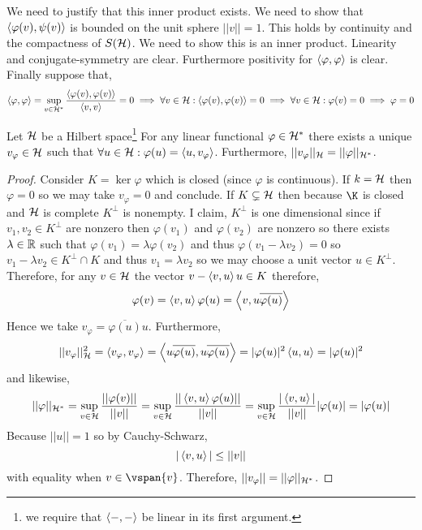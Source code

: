 \documentclass[12pt]{article}
\begin{document}
\begin{rmk}
We need to justify that this inner product exists. We need to show that $\left< \varphi(v) , \psi(v) \right>$ is bounded on the unit sphere $||v|| = 1$. This holds by continuity and the compactness of $S(\mathcal{H})$.
We need to show this is an inner product. Linearity and conjugate-symmetry are clear. Furthermore positivity for $\left< \varphi , \varphi \right>$ is clear. Finally suppose that,
\[ \left< \varphi , \varphi \right> = \sup_{v \in \mathcal{H}^*} \frac{\left< \varphi(v) , \varphi(v) \right>}{\left< v , v \right>} = 0 \implies \forall v \in \mathcal{H} : \left< \varphi(v) , \varphi(v) \right> = 0 \implies \forall v \in \mathcal{H} : \varphi(v) = 0 \implies \varphi = 0 \]
\end{rmk}

\begin{theorem}[Riesz]
Let $\mathcal{H}$ be a Hilbert space\footnote{we require that $\left< - , - \right>$ be linear in its first argument.} For any linear functional $\varphi \in \mathcal{H}^*$ there exists a unique $v_\varphi \in \mathcal{H}$ such that $\forall u \in \mathcal{H} : \varphi(u) = \left< u , v_\varphi \right>$. Furthermore, $|| v_\varphi ||_{\mathcal{H}} = || \varphi ||_{\mathcal{H}^*}$.
\end{theorem}

\begin{proof}
Consider $K = \ker{\varphi}$ which is closed (since $\varphi$ is continuous). If $k = \mathcal{H}$ then $\varphi = 0$ so we may take $v_\varphi = 0$ and conclude. If $K \subsetneq \mathcal{H}$ then because $\K$ is closed and $\mathcal{H}$ is complete $K^\perp$ is nonempty. I claim, $K^\perp$ is one dimensional since if $v_1, v_2 \in K^\perp$ are nonzero then $\varphi(v_1)$ and $\varphi(v_2)$ are nonzero so there exists $\lambda \in \mathbb{R}$ such that $\varphi(v_1) = \lambda \varphi(v_2)$ and thus $\varphi(v_1 - \lambda v_2) = 0$ so $v_1 - \lambda v_2 \in K^\perp \cap K$ and thus $v_1 = \lambda v_2$ so we may choose a unit vector $u \in K^\perp$. Therefore, for any $v \in \mathcal{H}$ the vector $v - \left< v , u \right> u \in K$ therefore,
\[ \varphi(v) = \left< v , u \right> \varphi(u) = \left< v , u \overline{\varphi(u)} \right> \]
Hence we take $v_\varphi = \overline{\varphi(u)} u$. Furthermore,
\[ || v_{\varphi} ||^2_{\mathcal{H}} = \left< v_\varphi , v_{\varphi} \right> = \left< u \overline{\varphi(u)} , u \overline{\varphi(u)} \right> = | \varphi(u) |^2 \left< u , u \right> = | \varphi(u) |^2 \]
and likewise,
\[ || \varphi ||_{\mathcal{H}^*} = \sup_{v \in \mathcal{H}} \frac{|| \varphi(v) ||}{|| v ||} = \sup_{v \in \mathcal{H}} \frac{|| \left< v , u \right> \varphi(u) ||}{|| v ||} = \sup_{v \in \mathcal{H}} \frac{| \left< v , u \right> |}{|| v ||} | \varphi(u) | = | \varphi(u) | \]
Because $|| u || = 1$ so by Cauchy-Schwarz,
\[ | \left< v , u \right> | \le || v || \]
with equality when $v \in \vspan{v}$. Therefore, $||v_\varphi|| = || \varphi ||_{\mathcal{H}^*}$.
\end{proof}
\end{document}

